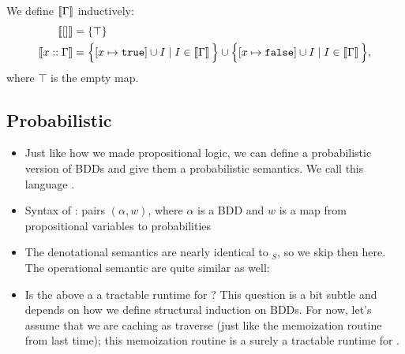 \documentclass{tufte-handout}
\begin{document}
\begin{itemize}
We define $\left \llbracket {\Gamma} \right \rrbracket$ inductively:
\begin{align*}
  \left \llbracket {[]} \right \rrbracket &= \{\top\} \\
  \left \llbracket {x :: \Gamma} \right \rrbracket &= \Big\{ [x \mapsto \texttt{true}] \cup I \mid I \in \left \llbracket {\Gamma} \right \rrbracket \Big\} \cup 
    \Big\{ [x \mapsto \texttt{false}] \cup I \mid I \in \left \llbracket {\Gamma} \right \rrbracket \Big\},
\end{align*}
where $\top$ is the empty map.
\end{itemize}

\subsection{Probabilistic \bdd{}}
\begin{itemize}
  \item Just like how we made propositional logic, we can define a probabilistic
  version of BDDs and give them a probabilistic semantics. We call this language
  \bdd{}. 
  \item Syntax of \bdd{}: pairs $(\alpha, w)$, where $\alpha$ is a BDD and $w$
  is a map from propositional variables to probabilities
  \item The denotational semantics are nearly identical to \prop$_S${}, so we skip 
  then here. The operational semantic are quite similar as well:
  
  \item Is the above a a tractable runtime for \bdd{}? 
  This question is a bit subtle and depends on how we
  define structural induction on BDDs. For now, let's assume that we are caching as 
  traverse (just like the memoization routine from last time); this memoization routine 
  is a surely a tractable runtime for \bdd{}.
\end{itemize}
\end{document}
